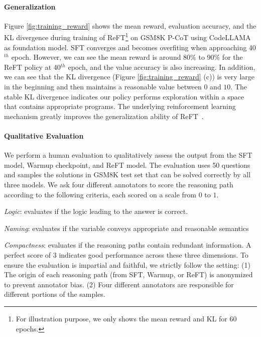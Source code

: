 \paragraph{Generalization}
Figure \ref{fig:training_reward} shows the mean reward, evaluation accuracy, and the KL divergence during training of ReFT\footnote{For illustration purpose, we only shows the mean reward and KL for $60$ epochs.} on GSM8K P-CoT using CodeLLAMA as foundation model. 
SFT converges and becomes overfiting when approaching 40$^{th}$ epoch. 
However, we can see the mean reward is around 80\% to 90\% for the ReFT policy at 40$^{th}$ epoch, and the value accuracy is also increasing. 
In addition, we can see that the KL divergence (Figure \ref{fig:training_reward} (c)) is very large in the beginning and then maintains a reasonable value between $0$ and $10$.
The stable KL divergence indicates our policy performs exploration within a space that contains appropriate programs. 
The underlying reinforcement learning mechanism greatly improves the generalization ability of ReFT~\cite{brown2020better}. 

\paragraph{Qualitative Evaluation}

We perform a human evaluation to qualitatively assess the output from the SFT model, Warmup checkpoint, and ReFT model. 
The evaluation uses 50 questions and samples the solutions in GSM8K test set that can be solved correctly by all three models. 
We ask four different annotators to score the reasoning path according to the following criteria, each scored on a scale from $0$ to $1$.
\squishlist
\item \textit{Logic}: evaluates if the logic leading to the answer is correct.
\item \textit{Naming}: evaluates if the variable conveys appropriate and reasonable semantics 
\item \textit{Compactness}: evaluates if the reasoning paths contain redundant information. 
\squishend
A perfect score of 3 indicates good performance across these three dimensions.
To ensure the evaluation is impartial and faithful, we strictly follow the setting:
(1) The origin of each reasoning path (from SFT, Warmup, or ReFT) is anonymized to prevent annotator bias.
(2) Four different annotators are responsible for different portions of the samples.

